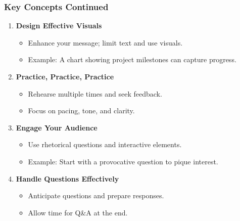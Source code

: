 \documentclass[aspectratio=169]{beamer}
\begin{document}
\begin{frame}
    \frametitle{Key Concepts Continued}
    \begin{enumerate}[resume]
        \item \textbf{Design Effective Visuals}
            \begin{itemize}
                \item Enhance your message; limit text and use visuals.
                \item Example: A chart showing project milestones can capture progress.
            \end{itemize}
        
        \item \textbf{Practice, Practice, Practice}
            \begin{itemize}
                \item Rehearse multiple times and seek feedback.
                \item Focus on pacing, tone, and clarity.
            \end{itemize}
        
        \item \textbf{Engage Your Audience}
            \begin{itemize}
                \item Use rhetorical questions and interactive elements.
                \item Example: Start with a provocative question to pique interest.
            \end{itemize}
        
        \item \textbf{Handle Questions Effectively}
            \begin{itemize}
                \item Anticipate questions and prepare responses.
                \item Allow time for Q\&A at the end.
            \end{itemize}
    \end{enumerate}
\end{frame}
\end{document}

